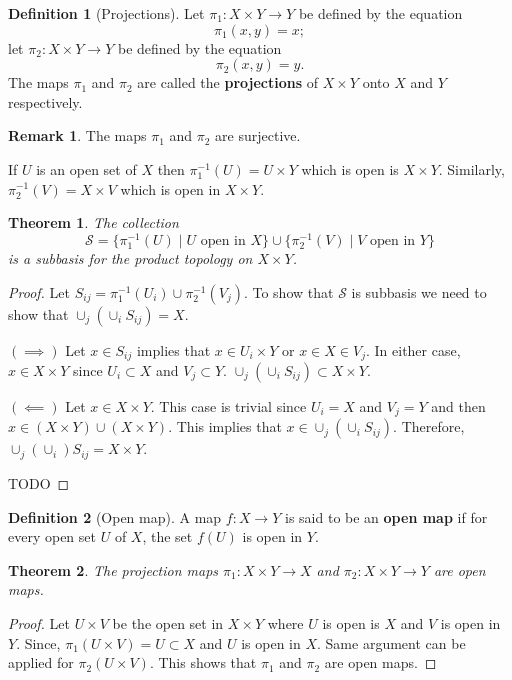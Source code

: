 \documentclass[12pt,reqno]{amsart}
\theoremstyle{plain}
\newtheorem{thm}{Theorem}
\theoremstyle{definition}
\newtheorem{defn}{Definition}
\newtheorem{rem}{Remark}
\newcommand{\cal}[1]{\mathcal{#1}}
\begin{document}
\begin{defn}[Projections]
    Let $\pi_1 : X \times Y \to Y$ be defined by the equation
    $$ \pi_1(x,y) = x;$$ 
    let $\pi_2 : X \times Y \to Y$ be defined by the equation
    $$ \pi_2(x,y) = y.$$
    The maps $\pi_1$ and $\pi_2$ are called the {\bf projections} of $X \times Y$ onto $X$ and $Y$ respectively.
\end{defn}
\begin{rem}
    The maps $\pi_1$ and $\pi_2$ are surjective.
\end{rem}
If $U$ is an open set of $X$ then $\pi_1^{-1}(U) = U \times Y$ which is open is $X \times Y$. Similarly, $\pi_2^{-1}(V) = X \times V$ which is open in $X \times Y$.

\begin{thm}
    The collection
    $$ \cal S = \{\pi_1^{-1}(U) \mid U \text{ open in } X\} \cup \{\pi_2^{-1}(V) \mid V \text{ open in } Y\}$$
    is a subbasis for the product topology on $X \times Y$.
\end{thm}
\begin{proof}
    Let $S_{ij} = \pi_1^{-1}(U_i) \cup \pi_2^{-1}(V_j)$. To show that $\cal S$ is subbasis we need to show that $\cup_j(\cup_i S_{ij}) = X$. 
    
    \noindent $(\implies)$ Let $x \in S_{ij}$ implies that $x \in U_i \times Y$ or $x \in X \in V_j$. In either case, $x \in X \times Y$ since $U_i \subset X$ and $V_j \subset Y$. $\cup_j(\cup_i S_{ij}) \subset X \times Y$.

    \noindent $(\impliedby)$ Let $x \in X \times Y$. This case is trivial since $U_i = X$ and $V_j = Y$ and then $x \in (X \times Y) \cup (X \times Y)$. This implies that $x \in \cup_j(\cup_i S_{ij})$. Therefore, $\cup_j(\cup_i)S_{ij} = X \times Y$. 

    TODO
\end{proof}

\begin{defn}[Open map]
    A map $f : X \to Y$ is said to be an {\bf open map} if for every open set $U$ of $X$, the set $f(U)$ is open in $Y$.
\end{defn}

\begin{thm}
    The projection maps $\pi_1 : X \times Y \to X$ and $\pi_2 : X \times Y \to Y$ are open maps.
\end{thm}
\begin{proof}
    Let $U \times V$ be the open set in $X \times Y$ where $U$ is open is $X$ and $V$ is open in $Y$. Since, $\pi_1(U \times V) = U \subset X$ and $U$ is open in $X$. Same argument can be applied for $\pi_2(U \times V)$. This shows that $\pi_1$ and $\pi_2$ are open maps.
\end{proof}
\end{document}
